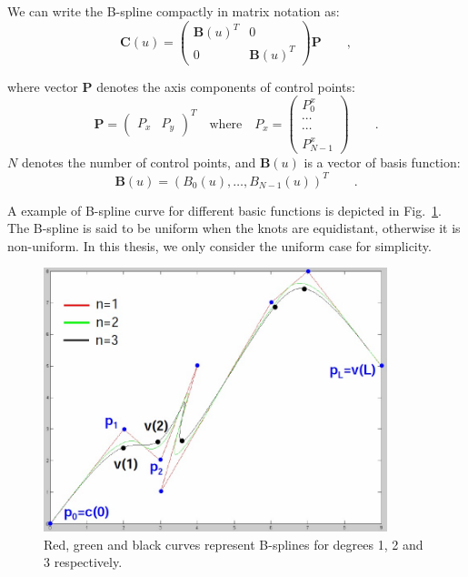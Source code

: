We can write the B-spline compactly in matrix notation as:
\begin{equation}
  \label{eq:4.3}
  \mathbf{C}(u) = 
  \begin{pmatrix}
\mathbf{B}(u)^T & 0 \\
0 &\mathbf{B}(u)^T
  \end{pmatrix}
\mathbf{P}\qquad,
\end{equation}

where vector $\mathbf{P}$ denotes the axis components of control
points:
\begin{equation}
  \label{eq:4.4}
  \mathbf{P} =
  \begin{pmatrix}
    P_x & P_y    
  \end{pmatrix}^T \quad \mathrm{where} \quad P_x =
  \begin{pmatrix}
    P_0^x\\
    \cdots\\
    \cdots\\
    P_{N-1}^x
  \end{pmatrix}\qquad .
\end{equation}
$N$ denotes the number of control points, and $\mathbf{B}(u)$ is a
vector of basis function:
\begin{equation}
  \label{eq:4.5}
  \mathbf{B}(u) = (B_0(u), \ldots, B_{N-1}(u))^T\qquad.
\end{equation}

A example of B-spline curve for different basic functions is depicted
in Fig.~\ref{fig:bspline}. The B-spline is said to be uniform when the knots are equidistant,
otherwise it is non-uniform. In this thesis, we only
consider the uniform case for simplicity.
\begin{figure}[htb]
  \centering
  \includegraphics[width=10cm]{images/bspline.jpg}
  \caption[B-spline curves for different degrees~\cite{contourpanin2011}]{Red, green and black
    curves represent B-splines for degrees 1, 2 and 3 respectively.}
\label{fig:bspline}
\end{figure}

